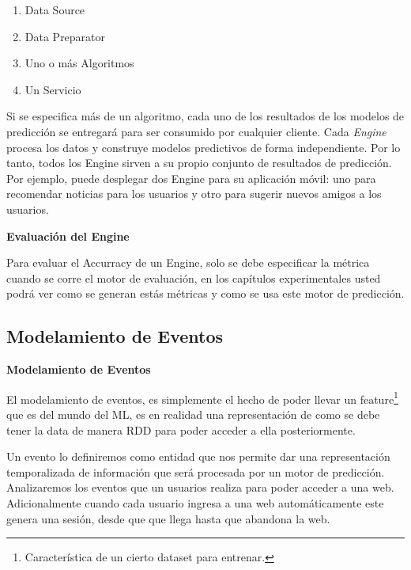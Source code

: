   \begin{enumerate}
    \item Data Source
    \item Data Preparator
    \item Uno o más Algoritmos
    \item Un Servicio
  \end{enumerate}

  Si se especifica más de un algoritmo, cada uno de los resultados de los modelos de predicción se entregará para ser consumido por cualquier cliente.
  Cada \emph{Engine} procesa los datos y construye modelos predictivos de forma independiente. Por lo tanto, todos los Engine sirven a su propio conjunto de resultados de predicción. Por ejemplo, puede desplegar dos Engine para su aplicación móvil: uno para recomendar noticias para los usuarios y otro para sugerir nuevos amigos a los usuarios.


\vspace{1cm}
\textbf{Evaluación del Engine }

  Para evaluar el Accurracy de un Engine, solo se debe especificar la métrica cuando se corre el motor de evaluación, en los capítulos experimentales usted podrá ver como se generan estás métricas y como se usa este motor de predicción.











\subsection{Modelamiento de Eventos}



\textbf{Modelamiento de Eventos}

  El modelamiento de eventos, es simplemente el hecho de poder llevar un feature\footnote{Característica de un cierto dataset para entrenar.}   que es del mundo del ML, es en realidad una representación de como se debe tener la data de manera RDD para poder acceder a ella posteriormente. 

  Un evento lo definiremos como entidad que nos permite dar una representación temporalizada de información que será procesada por un motor de predicción. Analizaremos los eventos que un usuarios realiza para poder acceder a una web. Adicionalmente cuando cada usuario ingresa a una web automáticamente este genera una sesión, desde que que llega hasta que abandona la web.

